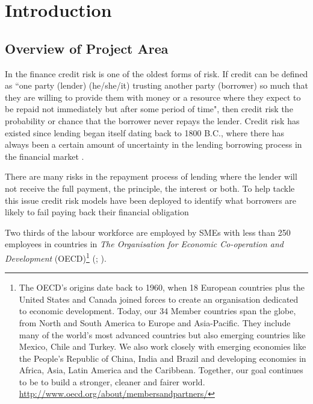 
\chapter{Introduction} %

\label{Chapter1} %


\section{Overview of Project Area}

In the finance credit risk is one of the oldest forms of risk. If credit can be defined as ``one party (lender) (he/she/it) trusting another party (borrower) so much that they are willing to provide them with money or a resource where they expect to be repaid not immediately but after some period of time", then credit risk the probability or chance that the borrower never repays the lender. Credit risk has existed since lending began itself dating back to 1800 B.C., where there has always been a certain amount of uncertainty in the lending borrowing process in the financial market \citep{caouette_managing_1998}.

There are many risks in the repayment process of lending where the lender will not receive the full payment, the principle, the interest or both. To help tackle this issue credit risk models have been deployed to identify what borrowers are likely to fail paying back their financial obligation \citep{sirirattanaphonkun_default_2012}

Two thirds of the labour workforce are employed by SMEs with less than 250 employees in countries in \textit{The Organisation for Economic Co-operation and Development} (OECD)\footnote{The OECD's origins date back to 1960, when 18 European countries plus the United States and Canada joined forces to create an organisation dedicated to economic development. Today, our 34 Member countries span the globe, from North and South America to Europe and Asia-Pacific. They include many of the world’s most advanced countries but also emerging countries like Mexico, Chile and Turkey. We also work closely with emerging economies like the People's Republic of China, India and Brazil and developing economies in Africa, Asia, Latin America and the Caribbean. Together, our goal continues to be to build a stronger, cleaner and fairer world. \url{http://www.oecd.org/about/membersandpartners/}} (\cite{beck_bank_2008}; \cite{dietrich_explaining_2012}).

